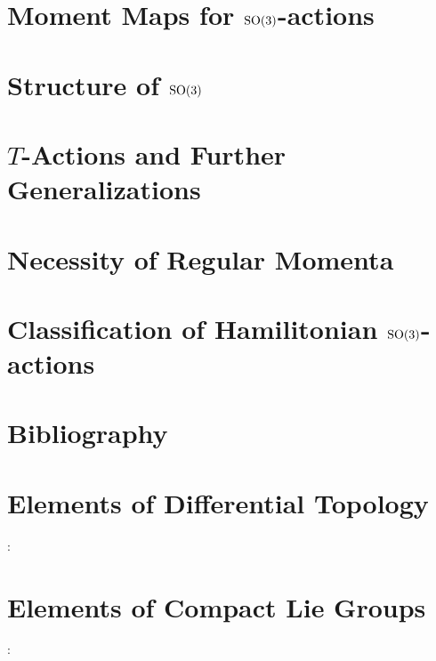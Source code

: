 \documentclass[12pt, oneside]{book}
\begin{document}
\chapter{Moment Maps for $\rm{SO}(3)$-actions}


\chapter{Structure of $\rm{SO}(3)$}


\chapter{$T$-Actions and Further Generalizations}


\chapter{Necessity of Regular Momenta}


\chapter{Classification of Hamilitonian $\rm{SO}(3)$-actions}


% 


\chapter*{Bibliography}

\printbibliography[heading=none]


\appendix

\chapter{Elements of Differential Topology}:



\chapter{Elements of Compact Lie Groups}:

\end{document}
